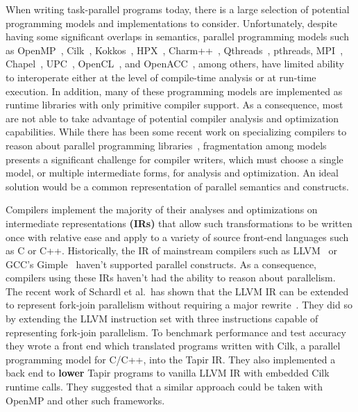 \documentclass[sigconf]{acmart}
\newcommand{\wmnote}[1]{{\scriptsize \color{red} [[ Billy: #1]]}}
\newcommand{\gsnote}[1]{{\scriptsize \color{blue} [[ George: #1]]}}
\begin{document}
When writing task-parallel programs today, there is a large selection of
potential programming models and implementations to consider. Unfortunately, 
despite having some significant overlaps in semantics, parallel programming
models such as OpenMP~\cite{openmp}, Cilk~\cite{cilk}, Kokkos~\cite{kokkos},
HPX~\cite{hpx}, Charm++~\cite{charm}, Qthreads~\cite{qthreads},
pthreads\cite{pthreads}, MPI~\cite{mpi}, Chapel~\cite{chapel}, UPC~\cite{upc},
OpenCL~\cite{opencl}, and OpenACC~\cite{openacc}, among others, have limited ability to
interoperate either at the level of compile-time analysis or at run-time
execution. In addition, many of these programming models are implemented as
runtime libraries with only primitive compiler support. As a consequence, most are
not able to take advantage of potential compiler analysis and optimization
capabilities.  While there has been some recent work on specializing
compilers to reason about parallel programming libraries~\cite{Moss_2016},
fragmentation among models presents a significant challenge for compiler
writers, which must choose a single model, or multiple intermediate forms, for
analysis and optimization. An ideal solution would be a 
common representation of parallel semantics and constructs.



Compilers implement the majority of their analyses and optimizations on
intermediate representations \textbf{(IRs)} that allow such transformations
to be written once with relative ease and apply to a variety of source
front-end languages such as C or C++.  Historically, the IR of mainstream
compilers such as LLVM~\cite{lattner2004llvm} or GCC's
Gimple~\cite{merrill2003generic} haven't supported parallel constructs. As a
consequence, compilers using these IRs haven't had the ability to reason
about parallelism. The recent work of Schardl et al.\ has shown
that the LLVM IR can be extended to represent fork-join parallelism without
requiring a major rewrite~\cite{tapir}.  They did so by extending the LLVM instruction set
with three instructions capable of representing fork-join parallelism. To
benchmark performance and test accuracy they wrote a front end which translated
programs written with Cilk, a parallel programming model for C/C++, into the
Tapir IR. They also implemented a back end to \textbf{lower} Tapir programs to
vanilla LLVM IR with embedded Cilk runtime calls. They suggested that a similar
approach could be taken with OpenMP and other such frameworks.
\end{document}

